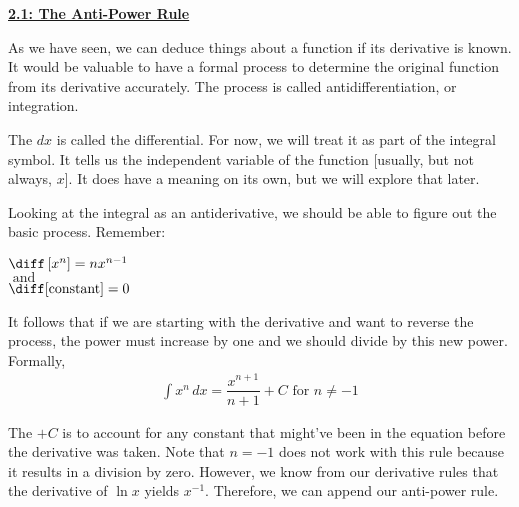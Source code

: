 \textbf{\underline{\large{2.1: The Anti-Power Rule }}} \par

As we have seen, we can deduce things about a function if its derivative is known. It would be valuable to have a formal process to determine the original function from its derivative accurately. The process is called antidifferentiation, or integration. \par

\begin{center}  
\end{center}

The $dx$ is called the differential. For now, we will treat it as part of the integral symbol. It tells us the independent variable of the function [usually, but not always, $x$]. It does have a meaning on its own, but we will explore that later. \par

Looking at the integral as an antiderivative, we should be able to figure out the basic process. Remember: \begin{center}
    $\diff \left[x^n\right] = nx^{n - 1}$ \\[11pt]
    $\text{ and }$ \\[11pt]
   $ \diff [\text{constant}] = 0$ \\[11pt]
\end{center}

It follows that if we are starting with the derivative and want to reverse the process, the power must increase by one and we should divide by this new power. Formally, \begin{align*}
    \int x^n \, dx = \dfrac{x^{n + 1}}{n + 1} + C \text{ for } n \neq -1
\end{align*}

The $+C$ is to account for any constant that might've been in the equation before the derivative was taken. Note that $n = -1$ does not work with this rule because it results in a division by zero. However, we know from our derivative rules that the derivative of $\ln x$ yields $x^{-1}$. Therefore, we can append our anti-power rule. \par


